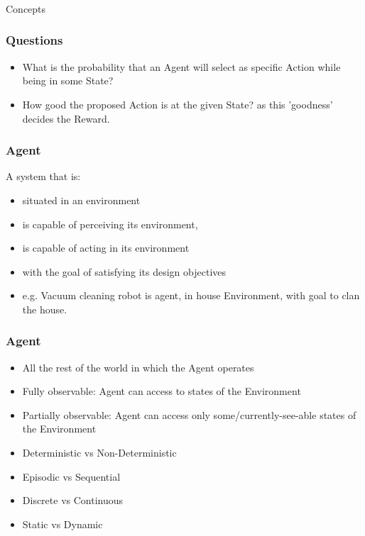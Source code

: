 \begin{frame}[fragile]\frametitle{}
\begin{center}
{\Large Concepts}
\end{center}
\end{frame}


\begin{frame}[fragile]\frametitle{Questions}

\begin{itemize}
\item What is the probability that an Agent will select as specific Action while being in some State?
\item How good the proposed Action is at the given State? as this 'goodness' decides the Reward.
\end{itemize}

\end{frame}

\begin{frame}[fragile]\frametitle{Agent}

A system that is:

\begin{itemize}
\item situated in an environment
\item is capable of perceiving its environment,
\item is capable of acting in its environment
\item with the goal of satisfying its design objectives
\item e.g. Vacuum cleaning robot is agent, in house Environment, with goal to clan the house.
\end{itemize}

\end{frame}

\begin{frame}[fragile]\frametitle{Agent}

\begin{itemize}
\item All the rest of the world in which the Agent operates
\item Fully observable: Agent can access to states of the Environment
\item Partially observable: Agent can access only some/currently-see-able states of the Environment
\item Deterministic vs Non-Deterministic
\item Episodic vs Sequential
\item Discrete vs Continuous
\item Static vs Dynamic
\end{itemize}

\end{frame}

